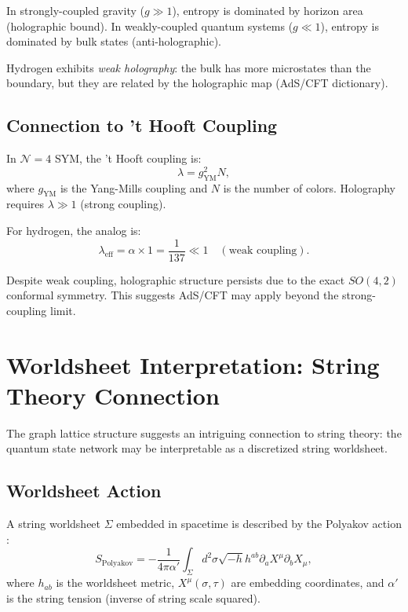 \documentclass[aps,prd,twocolumn,superscriptaddress,floatfix]{revtex4-2}
\begin{document}
In strongly-coupled gravity ($g \gg 1$), entropy is dominated by horizon area (holographic bound). In weakly-coupled quantum systems ($g \ll 1$), entropy is dominated by bulk states (anti-holographic).

Hydrogen exhibits \textit{weak holography}: the bulk has more microstates than the boundary, but they are related by the holographic map (AdS/CFT dictionary).

\subsection{Connection to 't Hooft Coupling}

In $\mathcal{N}=4$ SYM, the 't Hooft coupling is:
\begin{equation}
\lambda = g_{\text{YM}}^2 N,
\end{equation}
where $g_{\text{YM}}$ is the Yang-Mills coupling and $N$ is the number of colors. Holography requires $\lambda \gg 1$ (strong coupling).

For hydrogen, the analog is:
\begin{equation}
\lambda_{\text{eff}} = \alpha \times 1 = \frac{1}{137} \ll 1 \quad (\text{weak coupling}).
\end{equation}

Despite weak coupling, holographic structure persists due to the exact $SO(4,2)$ conformal symmetry. This suggests AdS/CFT may apply beyond the strong-coupling limit.


\section{Worldsheet Interpretation: String Theory Connection}

The graph lattice structure suggests an intriguing connection to string theory: the quantum state network may be interpretable as a discretized string worldsheet.

\subsection{Worldsheet Action}

A string worldsheet $\Sigma$ embedded in spacetime is described by the Polyakov action \cite{polyakov1981}:
\begin{equation}
S_{\text{Polyakov}} = -\frac{1}{4\pi\alpha'} \int_\Sigma d^2\sigma \sqrt{-h} h^{ab} \partial_a X^\mu \partial_b X_\mu,
\label{eq:polyakov}
\end{equation}
where $h_{ab}$ is the worldsheet metric, $X^\mu(\sigma, \tau)$ are embedding coordinates, and $\alpha'$ is the string tension (inverse of string scale squared).
\end{document}
